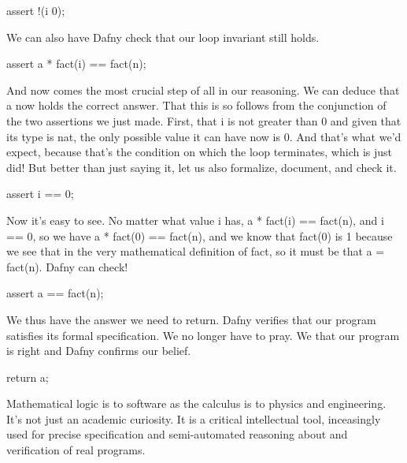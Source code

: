 \documentclass[letterpaper,10pt,english]{sphinxmanual}
\begin{document}
\begin{sphinxVerbatim}[commandchars=\\\{\}]
assert !(i \PYGZgt{} 0);
\end{sphinxVerbatim}

We can also have Dafny check that our loop invariant still holds.

\begin{sphinxVerbatim}[commandchars=\\\{\}]
assert a * fact(i) == fact(n);
\end{sphinxVerbatim}

And now comes the most crucial step of all in our reasoning. We can
deduce that a now holds the correct answer. That this is so follows
from the conjunction of the two assertions we just made. First, that i
is not greater than 0 and given that its type is nat, the only
possible value it can have now is 0. And that’s what we’d expect,
because that’s the condition on which the loop terminates, which is
just did! But better than just saying it, let us also formalize,
document, and check it.

\begin{sphinxVerbatim}[commandchars=\\\{\}]
assert i == 0;
\end{sphinxVerbatim}

Now it’s easy to see. No matter what value i has, a * fact(i) ==
fact(n), and i == 0, so we have a * fact(0) == fact(n), and we know
that fact(0) is 1 because we see that in the very mathematical
definition of fact, so it must be that a = fact(n). Dafny can check!

\begin{sphinxVerbatim}[commandchars=\\\{\}]
assert a == fact(n);
\end{sphinxVerbatim}

We thus have the answer we need to return.  Dafny verifies that our
program satisfies its formal specification. We no longer have to
pray. We  that our program is right and Dafny confirms our
belief.

\begin{sphinxVerbatim}[commandchars=\\\{\}]
return a;
\end{sphinxVerbatim}

Mathematical logic is to software as the calculus is to physics and
engineering.  It’s not just an academic curiosity. It is a critical
intellectual tool, inceasingly used for precise specification and
semi-automated reasoning about and verification of real programs.
\end{document}
